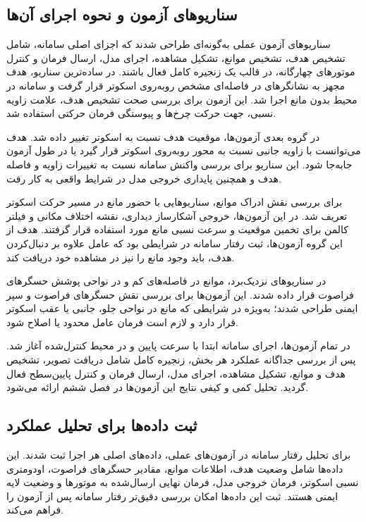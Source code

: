 \subsection{سناریوهای آزمون و نحوه اجرای آن‌ها}
\label{subsec:real_test_scenarios_execution}

سناریوهای آزمون عملی به‌گونه‌ای طراحی شدند که اجزای اصلی سامانه، شامل تشخیص هدف، تشخیص موانع، تشکیل مشاهده، اجرای مدل، ارسال فرمان و کنترل موتورهای چهارگانه، در قالب یک زنجیره کامل فعال باشند. در ساده‌ترین سناریو، هدف مجهز به نشانگرهای  در فاصله‌ای مشخص روبه‌روی اسکوتر قرار گرفت و سامانه در محیط بدون مانع اجرا شد. این آزمون برای بررسی صحت تشخیص هدف، علامت زاویه نسبی، جهت حرکت چرخ‌ها و پیوستگی فرمان حرکتی استفاده شد.

در گروه بعدی آزمون‌ها، موقعیت هدف نسبت به اسکوتر تغییر داده شد. هدف می‌توانست با زاویه جانبی نسبت به محور روبه‌روی اسکوتر قرار گیرد یا در طول آزمون جابه‌جا شود. این سناریو برای بررسی واکنش سامانه نسبت به تغییرات زاویه و فاصله هدف و همچنین پایداری خروجی مدل در شرایط واقعی به کار رفت.

برای بررسی نقش ادراک موانع، سناریوهایی با حضور مانع در مسیر حرکت اسکوتر تعریف شد. در این آزمون‌ها، خروجی آشکارساز دیداری، نقشه اختلاف مکانی و فیلتر کالمن برای تخمین موقعیت و سرعت نسبی مانع مورد استفاده قرار گرفتند. هدف از این گروه آزمون‌ها، ثبت رفتار سامانه در شرایطی بود که عامل علاوه بر دنبال‌کردن هدف، باید وجود مانع را نیز در مشاهده خود دریافت کند.

در سناریوهای نزدیک‌برد، موانع در فاصله‌های کم و در نواحی پوشش حسگرهای فراصوت قرار داده شدند. این آزمون‌ها برای بررسی نقش حسگرهای فراصوت و سپر ایمنی طراحی شدند؛ به‌ویژه در شرایطی که مانع در نواحی جلو، جانبی یا عقب اسکوتر قرار دارد و لازم است فرمان عامل محدود یا اصلاح شود.

در تمام آزمون‌ها، اجرای سامانه ابتدا با سرعت پایین و در محیط کنترل‌شده آغاز شد. پس از بررسی جداگانه عملکرد هر بخش، زنجیره کامل شامل دریافت تصویر، تشخیص هدف و موانع، تشکیل مشاهده، اجرای مدل، ارسال فرمان و کنترل پایین‌سطح فعال گردید. تحلیل کمی و کیفی نتایج این آزمون‌ها در فصل ششم ارائه می‌شود.

\subsection{ثبت داده‌ها برای تحلیل عملکرد}
\label{subsec:real_test_data_logging}

برای تحلیل رفتار سامانه در آزمون‌های عملی، داده‌های اصلی هر اجرا ثبت شدند. این داده‌ها شامل وضعیت هدف، اطلاعات موانع، مقادیر حسگرهای فراصوت، اودومتری نسبی اسکوتر، فرمان خروجی مدل، فرمان نهایی ارسال‌شده به موتورها و وضعیت لایه ایمنی هستند. ثبت این داده‌ها امکان بررسی دقیق‌تر رفتار سامانه پس از آزمون را فراهم می‌کند.

